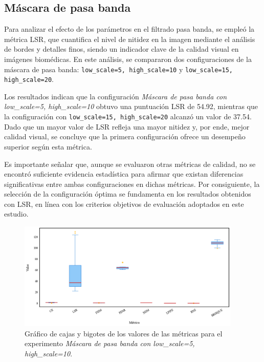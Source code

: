 \subsection{Máscara de pasa banda}

Para analizar el efecto de los parámetros en el filtrado pasa banda, se empleó la métrica LSR, que cuantifica el nivel de nitidez en la imagen mediante el análisis de bordes y detalles finos, siendo un indicador clave de la calidad visual en imágenes biomédicas. En este análisis, se compararon dos configuraciones de la máscara de pasa banda: \texttt{low\_scale=5, high\_scale=10} y \texttt{low\_scale=15, high\_scale=20}.

Los resultados indican que la configuración \textit{Máscara de pasa banda con low\_scale=5, high\_scale=10} obtuvo una puntuación LSR de 54.92, mientras que la configuración con \texttt{low\_scale=15, high\_scale=20} alcanzó un valor de 37.54. Dado que un mayor valor de LSR refleja una mayor nitidez y, por ende, mejor calidad visual, se concluye que la primera configuración ofrece un desempeño superior según esta métrica.

Es importante señalar que, aunque se evaluaron otras métricas de calidad, no se encontró suficiente evidencia estadística para afirmar que existan diferencias significativas entre ambas configuraciones en dichas métricas. Por consiguiente, la selección de la configuración óptima se fundamenta en los resultados obtenidos con LSR, en línea con los criterios objetivos de evaluación adoptados en este estudio.

\begin{figure}[H]
    \centering
    \includegraphics[width=0.95\textwidth]{Graphics/boxplot-bandpass-mask.png}
    \caption{Gráfico de cajas y bigotes de los valores de las métricas para el experimento \textit{Máscara de pasa banda con low\_scale=5, high\_scale=10}.}
    \label{fig:boxplot-bandpass}
\end{figure}

